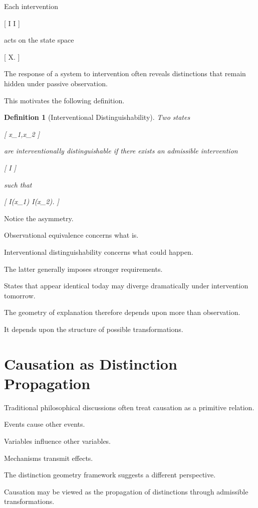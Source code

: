 \documentclass[11pt,oneside,openany]{book}
\newtheorem{definition}{Definition}[chapter] \newtheorem{theorem}{Theorem}[chapter] \newtheorem{proposition}{Proposition}[chapter] \newtheorem{lemma}{Lemma}[chapter] \newtheorem{corollary}{Corollary}[chapter] \newtheorem{remark}{Remark}[chapter]
\begin{document}
Each intervention

[
I
\in
\mathcal I
]

acts on the state space

[
\mathcal X.
]

The response of a system to intervention often reveals distinctions that remain hidden under passive observation.

This motivates the following definition.

\begin{definition}[Interventional Distinguishability]

Two states

[
x_1,x_2
]

are interventionally distinguishable if there exists an admissible intervention

[
I
]

such that

[
I(x_1)
\neq
I(x_2).
]

\end{definition}

Notice the asymmetry.

Observational equivalence concerns what is.

Interventional distinguishability concerns what could happen.

The latter generally imposes stronger requirements.

States that appear identical today may diverge dramatically under intervention tomorrow.

The geometry of explanation therefore depends upon more than observation.

It depends upon the structure of possible transformations.

\section{Causation as Distinction Propagation}

Traditional philosophical discussions often treat causation as a primitive relation.

Events cause other events.

Variables influence other variables.

Mechanisms transmit effects.

The distinction geometry framework suggests a different perspective.

Causation may be viewed as the propagation of distinctions through admissible transformations.
\end{document}
